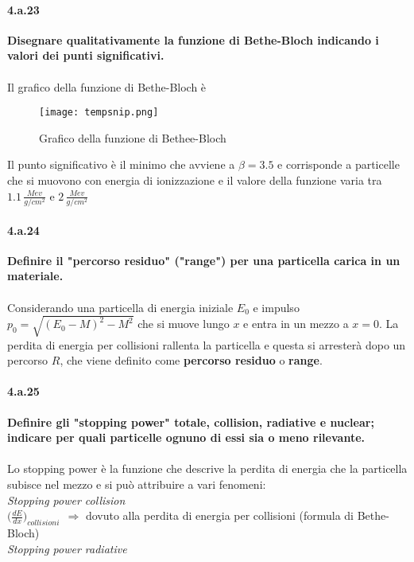\documentclass[twoside]{article}
\begin{document}
\paragraph{4.a.23}\textbf{Disegnare qualitativamente la funzione di Bethe-Bloch indicando i valori dei punti significativi.}\\ \\
Il grafico della funzione di Bethe-Bloch è
\begin{figure}[H]
    \centering
    \texttt{[image: tempsnip.png]}
    \caption{Grafico della funzione di Bethee-Bloch}
    \label{fig:bethebloch}
\end{figure}
Il punto significativo è il minimo che avviene a $\beta=3.5$ e corrisponde a particelle che si muovono con energia di ionizzazione e il valore della funzione varia tra $1.1\, \frac{Mev}{g/cm^2}$ e $2\, \frac{Mev}{g/cm^2}$ 
\paragraph{4.a.24}\textbf{Definire il "percorso residuo" ("range") per una particella carica in un materiale.}\\ \\
Considerando una particella di energia iniziale $E_0$ e impulso $p_0=\sqrt{(E_0-M)^2-M^2}$ che si muove lungo $x$ e entra in un mezzo a $x=0$. La perdita di energia per collisioni rallenta la particella e questa si arresterà dopo un percorso $R$, che viene definito come \textbf{percorso residuo} o \textbf{range}.


\paragraph{4.a.25}\textbf{Definire gli "stopping power" totale, collision, radiative e nuclear; indicare per quali particelle ognuno di essi sia o meno rilevante.}\\ \\
Lo stopping power è la funzione che descrive la perdita di energia che la particella subisce nel mezzo e si può attribuire a vari fenomeni:\\
\textit{Stopping power collision}\\

{\large$\biggl(\frac{dE}{dx}\biggr)_{collisioni}\ \ \Rightarrow$}  dovuto alla perdita di energia per collisioni (formula di Bethe-Bloch)\\

\textit{Stopping power radiative}\\
\end{document}

